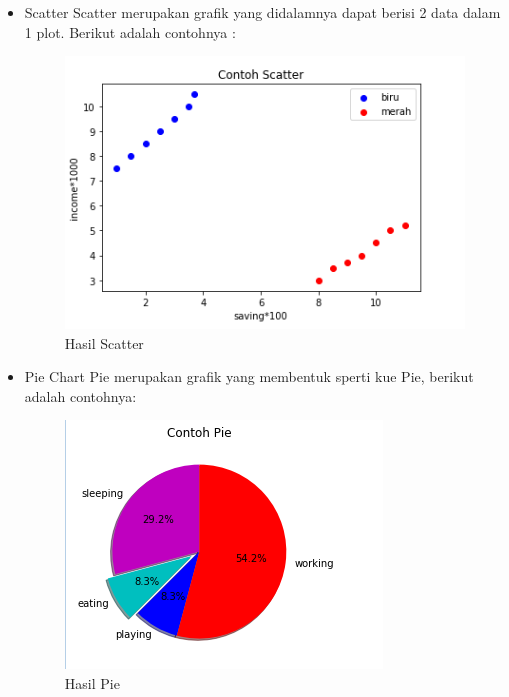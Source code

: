 \begin{itemize} 
    \item Scatter\newline
    Scatter merupakan grafik yang didalamnya dapat berisi 2 data dalam 1 plot.\newline
    Berikut adalah contohnya :

    

\begin{figure}[h]
\centering
\includegraphics[scale=0.5]{figures/6/Teori/1174038/4.png}
\caption{Hasil Scatter}
\label{fig:contoh}
\end{figure}
\end{itemize}

\begin{itemize}
    \item Pie\newline
    Chart Pie merupakan grafik yang membentuk sperti kue Pie, berikut adalah contohnya:
    
    

\begin{figure}[h]
\centering
\includegraphics[scale=0.6]{figures/6/Teori/1174038/5.png}
\caption{Hasil Pie}
\label{fig:contoh Pie}
\end{figure}


\end{itemize}

